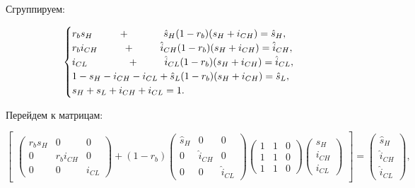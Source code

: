 \documentclass[a4paper]{report}
\begin{document}
	Сгруппируем:
	
	\begin{gather}
	\begin{cases}
	r_b s_H \qquad \;\; + \qquad \;\;\;\;\; \hat{s}_H (1 - r_b)(s_H +i_{CH}) = \hat{s}_H, \notag \\
	r_b i_{CH}	\qquad \;\; + \qquad \;\; \hat{i}_{CH} (1 - r_b)(s_H +i_{CH}) = \hat{i}_{CH},  \notag \\
	i_{CL} \qquad \qquad  + \qquad \;\; \hat{i}_{CL} (1 - r_b)(s_H + i_{CH}) = \hat{i}_{CL},  \notag \\
	1 - s_H - i_{CH} - i_{CL}	+ \hat{s}_L (1 - r_b) (s_H +i_{CH}) = \hat{s}_L, \notag \\
	s_H + s_L + i_{CH} + i_{CL} = 1. \notag
	\end{cases}
	\end{gather}
	
	
	Перейдем к матрицам:
	
	$$\begin{bmatrix}
	\begin{pmatrix}
		r_b s_H & 0 & 0\\
		0 & r_b i_{CH} & 0\\
		0 & 0 & i_{CL}
	\end{pmatrix}
	+ (1 - r_b)
	\begin{pmatrix}
	\hat{s}_H & 0 & 0\\
	0 & \hat{i}_{CH} & 0\\
	0 & 0 & \hat{i}_{CL}
	\end{pmatrix}
	\begin{pmatrix}
	1 & 1 & 0\\
	1 & 1 & 0\\
	1 & 1 & 0
	\end{pmatrix}
	
	\begin{pmatrix}
	s_H\\
	i_{CH}\\
	i_{CL}
	\end{pmatrix}
	\end{bmatrix}
	=
	\begin{pmatrix}
	\hat{s}_H\\
	\hat{i}_{CH}\\
	\hat{i}_{CL}
	\end{pmatrix},$$
	
\end{document}
